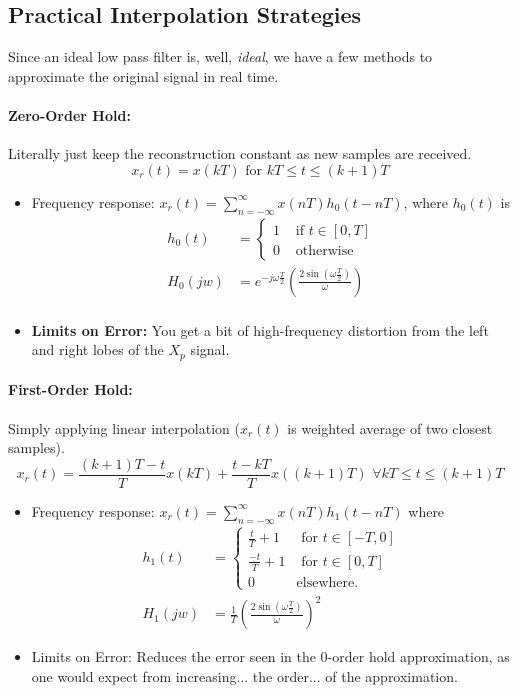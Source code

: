 \documentclass[a4paper,12pt]{report}
\begin{document}
\subsection{Practical Interpolation Strategies}

Since an ideal low pass filter is, well, \textit{ideal}, we have a few methods to approximate the original signal in real time. 

\paragraph{Zero-Order Hold: } Literally just keep the reconstruction constant as new samples are received.
\begin{equation}
x_r(t) = x(kT) \text{ for }kT \leq t \leq (k+1)T
\end{equation}
\begin{itemize}
\item Frequency response: $x_r(t) = \sum_{n=-\infty}^{\infty} x(nT) h_0(t-nT)$, where $h_0(t)$ is 
\begin{align}
h_0(t) &= \begin{cases}
1 & \text{ if } t\in [0,T]  \\
0 & \text{ otherwise}
\end{cases} \\
H_0(jw) &= e^{-j\omega\frac{T}{2}} (\frac{2\sin(\omega\frac{T}{2})}{\omega}) \\
\end{align}

\item \textbf{Limits on Error: } You get a bit of high-frequency distortion from the left and right lobes of the $X_p$ signal.
\end{itemize}

\paragraph{First-Order Hold: } Simply applying linear interpolation ($x_r(t)$ is weighted average of two closest samples).
\begin{equation}
x_r(t) = \frac{(k+1)T-t}{T} x(kT) + \frac{t-kT}{T} x((k+1)T)\,\,\forall kT\leq t\leq (k+1)T
\end{equation}
\begin{itemize}
\item Frequency response: $x_r(t) = \sum_{n=-\infty}^{\infty} x(nT)h_1(t-nT)$ where 
\begin{align}
h_1(t) &= \begin{cases}
\frac{t}{T} +1 & \text{ for } t\in [-T,0] \\
\frac{-t}{T} +1 & \text{ for } t\in [0, T] \\
0 & \text{elsewhere.}
\end{cases} \\
H_1(jw) &= \frac{1}{T} (\frac{2\sin(\omega\frac{T}{2})}{\omega})^2 
\end{align}
\item Limits on Error: Reduces the error seen in the 0-order hold approximation, as one would expect from increasing... the order... of the approximation.
\end{itemize}
\end{document}
